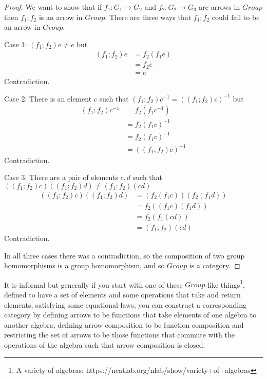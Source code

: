 \documentclass{proc-l}
\theoremstyle{definition}
\theoremstyle{remark}
\numberwithin{equation}{section}
\begin{document}

\begin{proof}
We want to show that 
if 
  $f_1 : G_1 \rightarrow G_2$ and $f_2 : G_2 \rightarrow G_3$ are arrows in $Group$
then 
  $f_1 ; f_2$ is an arrow in $Group$.
There are three ways that $f_1 ; f_2$ could fail to be an arrow in $Group$.

Case 1: $(f_1 ; f_2) e \neq e$ but
\begin{align*}
(f_1 ; f_2) e & = f_2 (f_1 e) \\
 & = f_2 e \\
 & = e
\end{align*}
Contradiction.

Case 2: There is an element $c$ such that $(f_1 ; f_2) c^{-1} = ((f_1 ; f_2) c)^{-1}$ but
\begin{align*}
(f_1 ; f_2) c^{-1}  & = f_2 (f_1 c^{-1}) \\
 & = f_2 (f_1 c)^{-1} \\
 & = f_2 (f_1 c)^{-1} \\
 & = ((f_1 ; f_2) c)^{-1}
\end{align*}
Contradiction.

Case 3: There are a pair of elements $c, d$ such that $((f_1 ; f_2) c) ((f_1 ; f_2) d) \neq (f_1 ; f_2) (c d)$
\begin{align*}
((f_1 ; f_2) c) ((f_1 ; f_2) d) & = (f_2 (f_1 c)) (f_2 (f_1 d)) \\
 & = f_2 ((f_1 c) (f_1 d)) \\
 & = f_2 (f_1 (c d)) \\
 & = (f_1 ; f_2) (c d)
\end{align*}
Contradiction.

In all three cases there was a contradiction, so the composition of two group homomorphisms is a group homomorphism, and so $Group$ is a category.
\end{proof}

It is informal but generally if you start with one of these $Group$-like things\footnote{A variety of algebras: https://ncatlab.org/nlab/show/variety+of+algebras}, defined to have a set of elements and some operations that take and return elements, satisfying some equational laws, you can construct a corresponding category by defining arrows to be functions that take elements of one algebra to another algebra, defining arrow composition to be function composition and restricting the set of arrows to be those functions that commute with the operations of the algebra such that arrow composition is closed.
\end{document}
